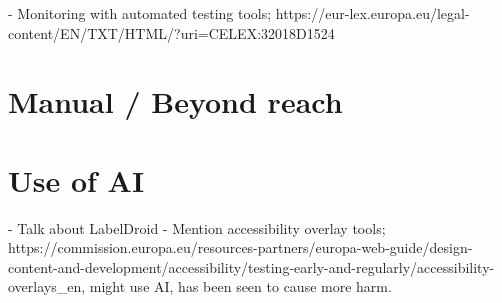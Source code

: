 - Monitoring with automated testing tools; https://eur-lex.europa.eu/legal-content/EN/TXT/HTML/?uri=CELEX:32018D1524

\section{Manual / Beyond reach}


\section{Use of AI}

- Talk about LabelDroid
- Mention accessibility overlay tools; https://commission.europa.eu/resources-partners/europa-web-guide/design-content-and-development/accessibility/testing-early-and-regularly/accessibility-overlays_en, might use AI, has been seen to cause more harm.